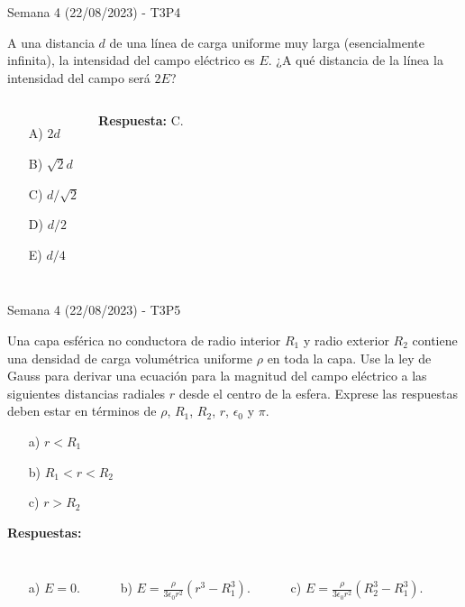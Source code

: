 \begin{frame}{Semana 4 (22/08/2023) - T3P4}
    
    A una distancia $d$ de una línea de carga uniforme muy larga (esencialmente infinita), la intensidad del campo eléctrico es $E$. ¿A qué distancia de la línea la intensidad del campo será $2E$?
    
    \begin{columns}
    \begin{itemize}
        \item[A)] $2d$
        \item[B)] $\sqrt{2}d$
        \item[C)] $d/\sqrt{2}$
        \item[D)] $d/2$
        \item[E)] $d/4$
    \end{itemize}
    \pause\centering\textbf{Respuesta:} C.
    \end{columns}
    
\end{frame}

\begin{frame}{Semana 4 (22/08/2023) - T3P5}
    
    Una capa esférica no conductora de radio interior $R_1$ y radio exterior $R_2$ contiene una densidad de carga volum\'etrica uniforme $\rho$ en toda la capa. Use la ley de Gauss para derivar una ecuación para la magnitud del campo eléctrico a las siguientes distancias radiales $r$ desde el centro de la esfera. Exprese las respuestas deben estar en términos de $\rho$, $R_1$, $R_2$, $r$, $\epsilon_0$ y $\pi$.
    
    \begin{itemize}
        \item[a)] $r<R_1$
        \item[b)] $R_1<r<R_2$
        \item[c)] $r>R_2$
    \end{itemize}
    
    \pause\textbf{Respuestas:} 
    \begin{columns}
    \begin{itemize}
        \item[a)] $E=0$.
    \end{itemize}
    \begin{itemize}
        \item[b)] $E=\frac{\rho}{3\epsilon_0 r^2}\left(r^3-R_1^3\right)$.
    \end{itemize}
    \begin{itemize}
        \item[c)] $E=\frac{\rho}{3\epsilon_0 r^2}\left(R_2^3-R_1^3\right)$.
    \end{itemize}
    \end{columns}
    
\end{frame}


